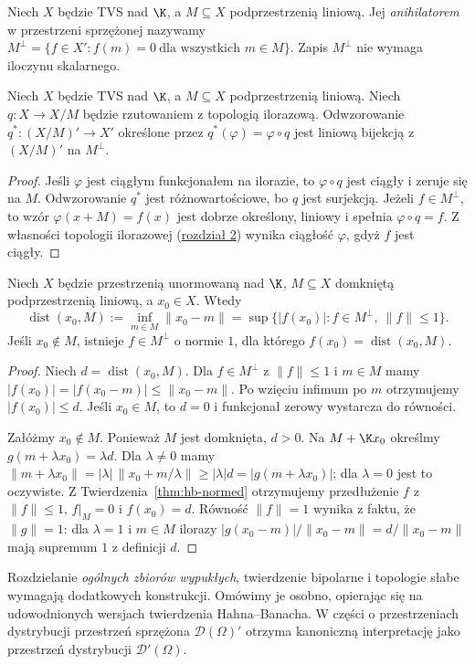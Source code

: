 \begin{definicja}[Anihilator]\label{def:annihilator}
Niech $X$ będzie TVS nad $\K$, a $M\subseteq X$
podprzestrzenią liniową. Jej \emph{anihilatorem}
w przestrzeni sprzężonej nazywamy
$M^\perp=\{f\in X':f(m)=0\ \text{dla wszystkich }m\in M\}$.
Zapis $M^\perp$ nie wymaga iloczynu skalarnego.
\end{definicja}

\begin{stwierdzenie}\label{prop:quotient-dual}
Niech $X$ będzie TVS nad $\K$, a $M\subseteq X$
podprzestrzenią liniową. Niech $q:X\to X/M$
będzie rzutowaniem z topologią ilorazową.
Odwzorowanie $q^*:(X/M)'\to X'$ określone przez
$q^*(\varphi)=\varphi\circ q$ jest liniową bijekcją
z $(X/M)'$ na $M^\perp$.
\end{stwierdzenie}
\begin{proof}
Jeśli $\varphi$ jest ciągłym funkcjonałem na ilorazie,
to $\varphi\circ q$ jest ciągły i zeruje się na $M$.
Odwzorowanie $q^*$ jest różnowartościowe, bo $q$
jest surjekcją. Jeżeli $f\in M^\perp$, to wzór
$\varphi(x+M)=f(x)$ jest dobrze określony, liniowy
i spełnia $\varphi\circ q=f$.
Z własności topologii ilorazowej (\hyperref[sec:konstrukcje]{rozdział 2})
wynika ciągłość $\varphi$, gdyż $f$ jest ciągły.
\end{proof}

\begin{twierdzenie}\label{thm:distance-dual}
Niech $X$ będzie przestrzenią unormowaną nad $\K$,
$M\subseteq X$ domkniętą podprzestrzenią liniową,
a $x_0\in X$. Wtedy
\[
 \operatorname{dist}(x_0,M):=\inf_{m\in M}\|x_0-m\|
 =\sup\{|f(x_0)|:f\in M^\perp,\ \|f\|\le1\}.
\]
Jeśli $x_0\notin M$, istnieje $f\in M^\perp$
o normie $1$, dla którego $f(x_0)=\operatorname{dist}(x_0,M)$.
\end{twierdzenie}
\begin{proof}
Niech $d=\operatorname{dist}(x_0,M)$.
Dla $f\in M^\perp$ z $\|f\|\le1$ i $m\in M$
mamy $|f(x_0)|=|f(x_0-m)|\le\|x_0-m\|$.
Po wzięciu infimum po $m$ otrzymujemy $|f(x_0)|\le d$.
Jeśli $x_0\in M$, to $d=0$ i funkcjonał zerowy
wystarcza do równości.

Załóżmy $x_0\notin M$. Ponieważ $M$ jest domknięta,
$d>0$. Na $M+\K x_0$ określmy
$g(m+\lambda x_0)=\lambda d$.
Dla $\lambda\ne0$ mamy
$\|m+\lambda x_0\|=|\lambda|\,
\|x_0+m/\lambda\|\ge|\lambda|d=|g(m+\lambda x_0)|$;
dla $\lambda=0$ jest to oczywiste.
Z Twierdzenia~\ref{thm:hb-normed} otrzymujemy
przedłużenie $f$ z $\|f\|\le1$, $f|_M=0$ i
$f(x_0)=d$. Równość $\|f\|=1$ wynika z faktu, że
$\|g\|=1$: dla $\lambda=1$ i $m\in M$ ilorazy
$|g(x_0-m)|/\|x_0-m\|=d/\|x_0-m\|$
mają supremum $1$ z definicji $d$.
\end{proof}

\begin{uwaga}
Rozdzielanie \emph{ogólnych zbiorów wypukłych}, twierdzenie
bipolarne i topologie słabe wymagają dodatkowych konstrukcji.
Omówimy je osobno, opierając się na udowodnionych
wersjach twierdzenia Hahna--Banacha. W części o przestrzeniach
dystrybucji przestrzeń sprzężona $\mathcal D(\Omega)'$ otrzyma
kanoniczną interpretację jako przestrzeń dystrybucji
$\mathcal D'(\Omega)$.
\end{uwaga}
